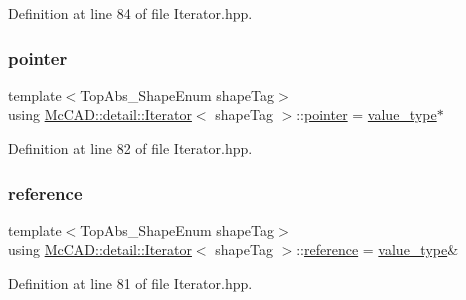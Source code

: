 Definition at line 84 of file Iterator.\+hpp.

\mbox{\label{classMcCAD_1_1detail_1_1Iterator_af8329892a305bc807e47158f8b877597}} 
\subsubsection{\texorpdfstring{pointer}{pointer}}
{\footnotesize\ttfamily template$<$Top\+Abs\+\_\+\+Shape\+Enum shape\+Tag$>$ \\
using \hyperlink{classMcCAD_1_1detail_1_1Iterator}{Mc\+C\+A\+D\+::detail\+::\+Iterator}$<$ shape\+Tag $>$\+::\hyperlink{classMcCAD_1_1detail_1_1Iterator_af8329892a305bc807e47158f8b877597}{pointer} =  \hyperlink{classMcCAD_1_1detail_1_1Iterator_af35396d00c2403ccfbf1b6aa51cbf40e}{value\+\_\+type}$\ast$}



Definition at line 82 of file Iterator.\+hpp.

\mbox{\label{classMcCAD_1_1detail_1_1Iterator_a99d36aa906470f6e3f2783b921c71ff5}} 
\subsubsection{\texorpdfstring{reference}{reference}}
{\footnotesize\ttfamily template$<$Top\+Abs\+\_\+\+Shape\+Enum shape\+Tag$>$ \\
using \hyperlink{classMcCAD_1_1detail_1_1Iterator}{Mc\+C\+A\+D\+::detail\+::\+Iterator}$<$ shape\+Tag $>$\+::\hyperlink{classMcCAD_1_1detail_1_1Iterator_a99d36aa906470f6e3f2783b921c71ff5}{reference} =  \hyperlink{classMcCAD_1_1detail_1_1Iterator_af35396d00c2403ccfbf1b6aa51cbf40e}{value\+\_\+type}\&}



Definition at line 81 of file Iterator.\+hpp.

\mbox{\label{classMcCAD_1_1detail_1_1Iterator_af35396d00c2403ccfbf1b6aa51cbf40e}} 
